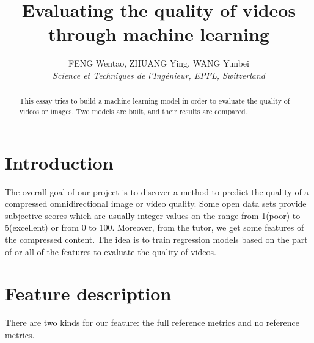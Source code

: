 \documentclass[10pt,conference,compsocconf]{IEEEtran}
\begin{document}
\title{Evaluating the quality of videos through machine learning}

\author{
  FENG Wentao, ZHUANG Ying, WANG Yunbei\\
  \textit{Science et Techniques de l'Ingénieur, EPFL, Switzerland}
}

\maketitle

\begin{abstract}
  This essay tries to build a machine learning model in order to evaluate the quality of videos or images. Two models are built, and their results are compared.
\end{abstract}

\section{Introduction}
The overall goal of our project is to discover a method to predict the quality of a compressed omnidirectional image or video quality.  Some open data sets provide subjective scores which are usually integer values on the range from 1(poor) to 5(excellent) or from 0 to 100. Moreover, from the tutor, we get some features of the compressed content. The idea is to train regression models based on the part of or all of the features to evaluate the quality of videos.

\section{Feature description}
There are two kinds for our feature: the full reference metrics and no reference metrics. 
\end{document}
